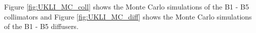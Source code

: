 \begin{figure}[!htbp]
        
    \end{figure}


    Figure \ref{fig:UKLI_MC_coll} shows the Monte Carlo simulations of the B1 - B5 collimators and Figure \ref{fig:UKLI_MC_diff} shows the Monte Carlo simulations of the B1 - B5 diffusers.


